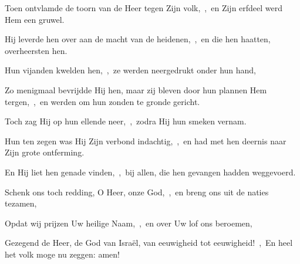 \documentclass[12pt,twoside,a5paper]{article}
\begin{document}
\begin{halfparskip}
  Toen ontvlamde de toorn van de Heer tegen Zijn volk,~\sep\ en Zijn erfdeel werd Hem een gruwel.

  Hij leverde hen over aan de macht van de heidenen,~\sep\ en die hen haatten, overheersten hen.

  Hun vijanden kwelden hen,~\sep\ ze werden neergedrukt onder hun hand,

  Zo menigmaal bevrijdde Hij hen, maar zij bleven door hun plannen Hem tergen,~\sep\ en werden om hun zonden te gronde gericht.

  Toch zag Hij op hun ellende neer,~\sep\ zodra Hij hun smeken vernam.

  Hun ten zegen was Hij Zijn verbond indachtig,~\sep\ en had met hen deernis naar Zijn grote ontferming.

  En Hij liet hen genade vinden,~\sep\ bij allen, die hen gevangen hadden weggevoerd.

  Schenk ons toch redding, O Heer, onze God,~\sep\ en breng ons uit de naties tezamen,

  Opdat wij prijzen Uw heilige Naam,~\sep\ en over Uw lof ons beroemen,

  Gezegend de Heer, de God van Israël, van eeuwigheid tot eeuwigheid!~\sep\ En heel het volk moge nu zeggen: amen!
\end{halfparskip}
\end{document}
